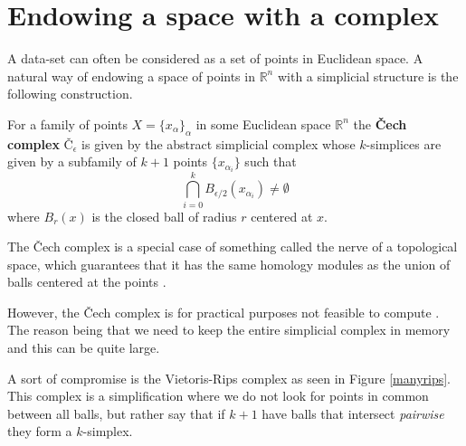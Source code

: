 \section{Endowing a space with a complex}
A data-set can often be considered as a set of points in Euclidean space. A natural way of endowing a space of points in $\mathbb{R}^{n}$ with a simplicial structure is the following construction.
\begin{definition}
For a family of points $X=\{x_{\alpha}\}_{\alpha}$ in some Euclidean space $\mathbb{R}^{n}$ the \textbf{Čech complex}
$\text{Č}_{\epsilon}$ is given by the abstract simplicial complex whose $k$-simplices are given by a subfamily of $k+1$ points $\{x_{\alpha_{i}}\}$ such that \[\bigcap^{k}_{i=0} B_{\epsilon/2}(x_{\alpha_{i}}) \neq \emptyset\] where $B_{r}(x)$ is the closed ball of radius $r$ centered at $x$.
\end{definition}
The Čech complex is a special case of something called the nerve of a topological space, which guarantees that it has the same homology modules as the union of balls centered at the points \cite[p. ~71]{edels}.

However, the Čech complex is for practical purposes not feasible to compute \cite{ghirst}. The reason being that we need to keep the entire simplicial complex in memory and this can be quite large.

A sort of compromise is the Vietoris-Rips complex as seen in Figure \ref{manyrips}. This complex is a simplification where we do not look for points in common between all balls, but rather say that if $k+1$ have balls that intersect \textit{pairwise} they form a $k$-simplex.

